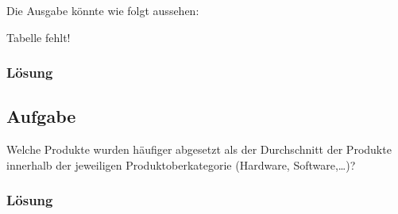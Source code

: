 Die Ausgabe könnte wie folgt aussehen:
\begin{WARN}
  Tabelle fehlt!
\end{WARN}

\subsubsection*{Lösung}
\label{subsubsec:uebung_07.aufgabe_05.loesung}


\label{subsec:uebung_07.aufgabe_06}
\subsection{Aufgabe}
Welche Produkte wurden häufiger abgesetzt als der Durchschnitt der Produkte innerhalb der jeweiligen Produktoberkategorie (Hardware, Software,…)?

\subsubsection*{Lösung}
\label{subsubsec:uebung_07.aufgabe_06.loesung}
